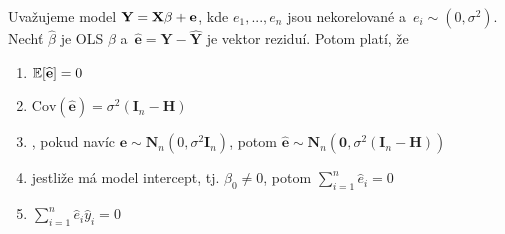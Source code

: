 \begin{theorem}
	Uvažujeme model $\textbf{Y} = \textbf{X} \beta + \textbf{e}$, kde $e_1,..., e_n$ jsou nekorelované a~$e_i \sim (0,\sigma^2)$. Nechť $\widehat{\beta}$ je OLS $\beta$ a~$\widehat{\textbf{e}} = \textbf{Y} - \widehat{\textbf{Y}}$ je vektor reziduí. Potom platí, že
	
\begin{enumerate}
\item $\mathbb{E} [\widehat{\textbf{e}}] = 0$
\item $\text{Cov}(\widehat{\textbf{e}}) = \sigma^2 (\textbf{I}_n - \textbf{H})$
\item, pokud navíc $\textbf{e} \sim \textbf{N}_n (0, \sigma^2 \textbf{I}_n)$, potom $\widehat{\textbf{e}} \sim \textbf{N}_n (\textbf{0}, \sigma^2 (\textbf{I}_n - \textbf{H}))$
\item jestliže má model intercept, tj. $\beta_0 \neq 0$, potom $\sum_{i = 1}^n \widehat{e}_i = 0$
\item $\sum_{i = 1}^n \widehat{e}_i \widehat{y}_i = 0$
\end{enumerate}		
\end{theorem}

